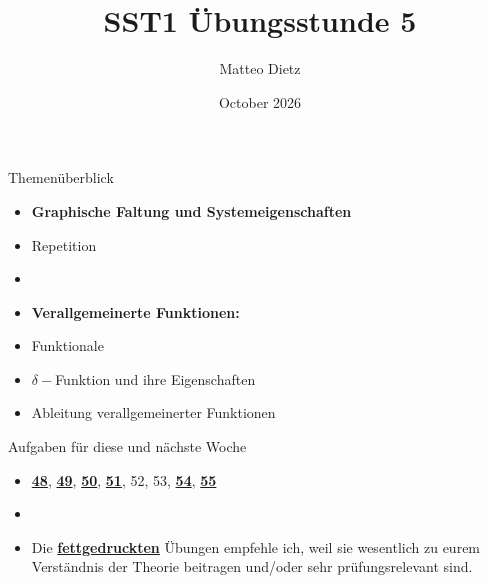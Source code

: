 \documentclass[14pt, aspectratio=169, handout]{beamer}
\title{SST1 Übungsstunde 5}
\author{Matteo Dietz}
\date{October 2026}
\begin{document}
\maketitle


\begin{frame}{Themenüberblick}
    \begin{itemize}
    \item \textbf{Graphische Faltung und Systemeigenschaften}
    \item[] Repetition
    \item[] 
    \item \textbf{Verallgemeinerte Funktionen:}
    \item[] Funktionale
    \item[] $\delta-$Funktion und ihre Eigenschaften
    \item[] Ableitung verallgemeinerter Funktionen
    \end{itemize}
\end{frame}


\begin{frame}{Aufgaben für diese und nächste Woche}
    \begin{itemize}
        \item[] \underline{\textbf{48}}, \underline{\textbf{49}}, \underline{\textbf{50}}, \underline{\textbf{51}}, 52, 53, \underline{\textbf{54}}, \underline{\textbf{55}}
        \item[] 
        \item[] Die \underline{\textbf{fettgedruckten}} Übungen empfehle ich, weil sie wesentlich zu eurem Verständnis der Theorie beitragen und/oder sehr prüfungsrelevant sind.
    \end{itemize}
\end{frame}
\end{document}
